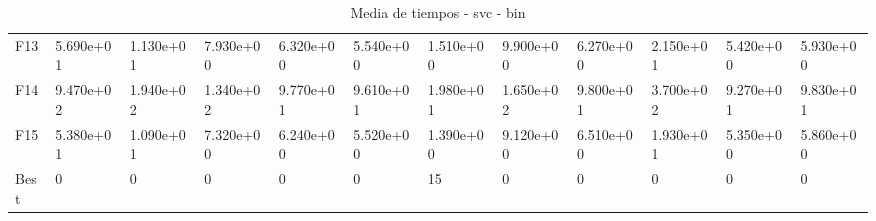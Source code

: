 \begin{table}
\begin{adjustbox}{width=\linewidth}
\begin{tabular}{llllllllllll}
            F13  & 5.690e+01 & 1.130e+01 & 7.930e+00 & 6.320e+00 & 5.540e+00 & 1.510e+00 & 9.900e+00 & 6.270e+00 & 2.150e+01 & 5.420e+00 & 5.930e+00 \\
            F14  & 9.470e+02 & 1.940e+02 & 1.340e+02 & 9.770e+01 & 9.610e+01 & 1.980e+01 & 1.650e+02 & 9.800e+01 & 3.700e+02 & 9.270e+01 & 9.830e+01 \\
            F15  & 5.380e+01 & 1.090e+01 & 7.320e+00 & 6.240e+00 & 5.520e+00 & 1.390e+00 & 9.120e+00 & 6.510e+00 & 1.930e+01 & 5.350e+00 & 5.860e+00 \\
            Best & 0         & 0         & 0         & 0         & 0         & 15        & 0         & 0         & 0         & 0         & 0         \\
            \bottomrule
        \end{tabular}
    \end{adjustbox}
    \caption{Media de tiempos - svc - bin}
    \label{tab:mean_time_svc_bin}
\end{table}

